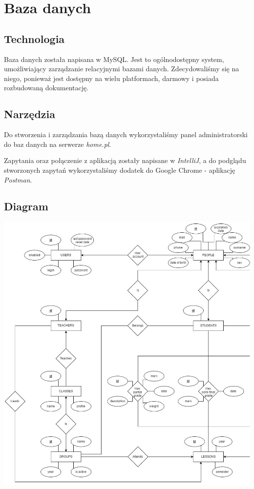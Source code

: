 \documentclass[12pt, titlepage]{article}
\begin{document}
\section{Baza danych}

\subsection{Technologia}
Baza danych została napisana w MySQL. Jest to ogólnodostępny system, umożliwiający zarządzanie relacyjnymi bazami danych. Zdecydowaliśmy się na niego, ponieważ jest dostępny na wielu platformach, darmowy i posiada rozbudowaną dokumentację. 

\subsection{Narzędzia}
Do stworzenia i zarządzania bazą danych wykorzystaliśmy panel administratorski do baz danych na serwerze \textit{home.pl}. 

Zapytania oraz połączenie z aplikacją zostały napisane w \textit{IntelliJ}, a do podglądu stworzonych zapytań wykorzystaliśmy dodatek do Google Chrome - aplikację \textit{Postman}. 

\subsection{Diagram}
\begin{center}
\includegraphics[scale=0.5]{screeny/diagram1.jpg}
\end{center}
\end{document}
